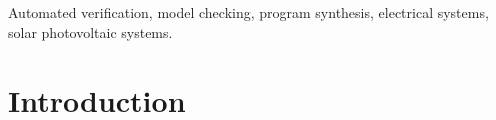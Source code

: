 \documentclass[journal]{IEEEtran}
\begin{document}
\begin{IEEEkeywords}
Automated verification, model checking, program synthesis, electrical systems, solar photovoltaic systems.
\end{IEEEkeywords}


%
\IEEEpeerreviewmaketitle



\section{Introduction}
% 
% 
% 
% 
%
%
\end{document}
